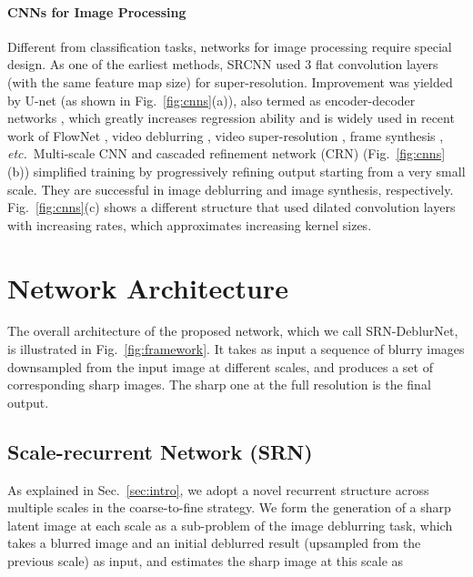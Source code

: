 \documentclass[10pt,twocolumn,letterpaper]{article}
\def\etc{\emph{etc.}} \def\vs{\emph{vs}.}
\begin{document}
\paragraph{CNNs for Image Processing}
Different from classification tasks, networks for image processing require special design. As one of the earliest methods, SRCNN \cite{dong2014learning} used 3 flat convolution layers (with the same feature map size) for super-resolution. Improvement was yielded by U-net \cite{ronneberger2015u} (as shown in Fig.~\ref{fig:cnns}(a)), also termed as encoder-decoder networks \cite{mao2016image}, which greatly increases regression ability and is widely used in recent work of FlowNet \cite{dosovitskiy2015flownet}, video deblurring \cite{su2017deep}, video super-resolution \cite{tao2017spmc}, frame synthesis \cite{liu2017video}, \etc~Multi-scale CNN \cite{nah2017deep} and cascaded refinement network (CRN) \cite{chen2017photographic} (Fig.~\ref{fig:cnns}(b)) simplified training by progressively refining output starting from a very small scale. They are successful in image deblurring and image synthesis, respectively. Fig.~\ref{fig:cnns}(c) shows a different structure \cite{chen2017fast} that used dilated convolution layers with increasing rates, which approximates increasing kernel sizes.



\section{Network Architecture}\label{sec:network}

The overall architecture of the proposed network, which we call SRN-DeblurNet, is illustrated in Fig.~\ref{fig:framework}. It takes as input a sequence of blurry images downsampled from the input image at different scales, and produces a set of corresponding sharp images. The sharp one at the full resolution is the final output.

\subsection{Scale-recurrent Network (SRN)}
As explained in Sec.~\ref{sec:intro}, we adopt a novel recurrent structure across multiple scales in the coarse-to-fine strategy. We form the generation of a sharp latent image at each scale as a sub-problem of the image deblurring task, which takes a blurred image and an initial deblurred result (upsampled from the previous scale) as input, and estimates the sharp image at this scale as
\end{document}
